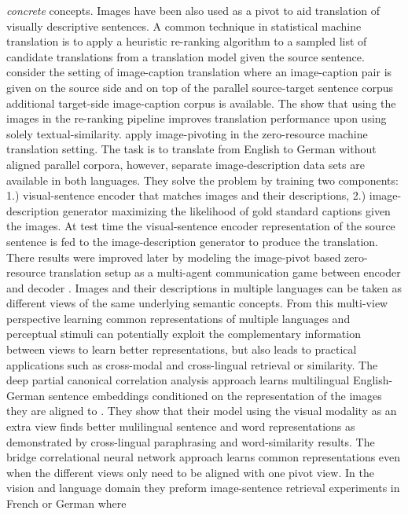 \emph{concrete} concepts.
Images have been also used as a pivot to aid translation of visually descriptive sentences.
A common technique in statistical machine translation is to apply a heuristic re-ranking algorithm
to a sampled list of candidate translations from a translation model given the source sentence.
\cite{hitschler2016multimodal} consider the setting of image-caption translation where an
image-caption pair is given on the source side and on top of the parallel source-target sentence corpus
additional target-side image-caption corpus is available. The show that using the images in the re-ranking
pipeline improves translation performance upon using solely textual-similarity.
\cite{nakayama2017zero} apply image-pivoting in the zero-resource machine translation setting.
The task is to translate from English to German without aligned parallel corpora, however,
separate image-description data sets are available in both languages. They solve the problem by
training two components: 1.) visual-sentence encoder that matches images and their descriptions,
2.) image-description generator maximizing the likelihood of gold standard captions given the images.
At test time the visual-sentence encoder representation of the source sentence is fed to the
image-description generator to produce the translation. There results were improved later by modeling
the image-pivot based zero-resource translation setup as a multi-agent communication game between
encoder and decoder \cite{chen2018zero,lee2017emergent}.
Images and their descriptions in multiple languages can be taken as different views of the
same underlying semantic concepts. From this multi-view perspective learning common representations
of multiple languages and perceptual stimuli can potentially exploit the complementary information
between views to learn better representations, but also leads to practical applications such as
cross-modal and cross-lingual retrieval or similarity. The deep partial canonical correlation
analysis approach learns multilingual English-German sentence embeddings conditioned on the
representation of the images they are aligned to \cite{rotman2018bridging}. They show that their model using
the visual modality as an extra view finds better mulilingual sentence and word representations
as demonstrated by cross-lingual paraphrasing and word-similarity results.
The bridge correlational neural network approach \cite{rajendran2015bridge} learns common representations
even when the different views only need to be aligned with one pivot view.
In the vision and language domain they preform image-sentence retrieval experiments in French or German where
